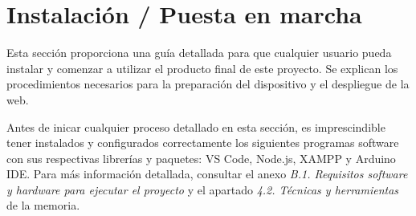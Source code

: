 \section{Instalación / Puesta en marcha}
Esta sección proporciona una guía detallada para que cualquier usuario pueda instalar y comenzar a utilizar el producto final de este proyecto. Se explican los procedimientos necesarios para la preparación del dispositivo y el despliegue de la web.

Antes de inicar cualquier proceso detallado en esta sección, es imprescindible tener instalados y configurados correctamente los siguientes programas software con sus respectivas librerías y paquetes: VS Code, Node.js, XAMPP y Arduino IDE. Para más información detallada, consultar el anexo \textit{B.1. Requisitos software y hardware para ejecutar el proyecto} y el apartado \textit{4.2. Técnicas y herramientas} de la memoria.

